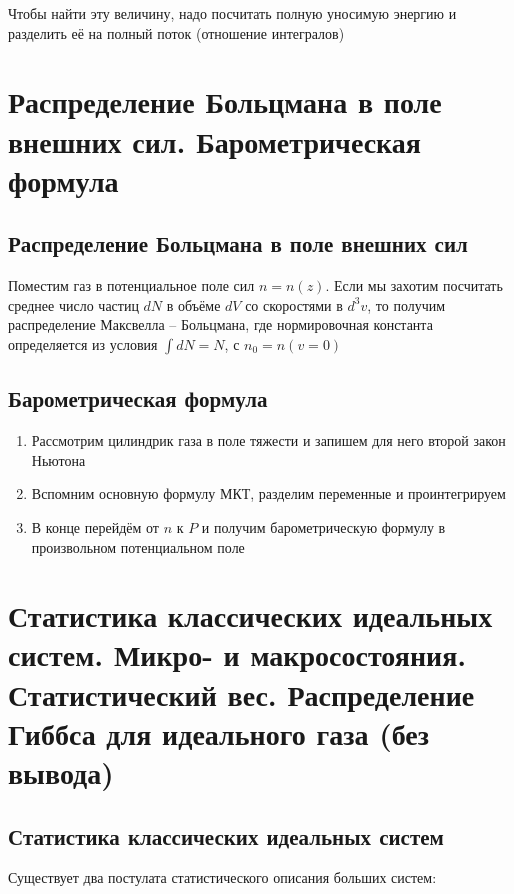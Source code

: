 \documentclass[a4paper, 14pt]{article}
\begin{document}
    Чтобы найти эту величину, надо посчитать полную уносимую энергию и разделить её на полный поток (отношение
    интегралов)

    \section{Распределение Больцмана в поле внешних сил.
    Барометрическая формула}

    \subsection{Распределение Больцмана в поле внешних сил}

    Поместим газ в потенциальное поле сил $n = n(z)$.
    Если мы захотим посчитать среднее число частиц $dN$ в объёме $dV$ со скоростями в $d^3 v$, то получим
    распределение Максвелла -- Больцмана, где нормировочная константа определяется из условия $\int dN = N$, с $n_0
    = n(v = 0)$

    \subsection{Барометрическая формула}

    \begin{enumerate}
        \item Рассмотрим цилиндрик газа в поле тяжести и запишем для него второй закон Ньютона
        \item Вспомним основную формулу МКТ, разделим переменные и проинтегрируем
        \item В конце перейдём от $n$ к $P$ и получим барометрическую формулу в произвольном потенциальном поле
    \end{enumerate}

    \section{Статистика классических идеальных систем.
    Микро- и макросостояния.
    Статистический вес.
    Распределение Гиббса для идеального газа (без вывода)}

    \subsection{Статистика классических идеальных систем}

    Существует два постулата статистического описания больших систем:
\end{document}
